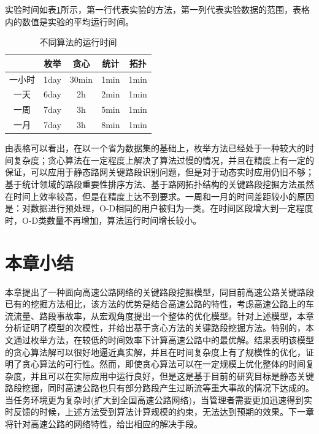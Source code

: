 				实验时间如表\ref{table1}所示，第一行代表实验的方法，第一列代表实验数据的范围，表格内的数值是实验的平均运行时间。

				\begin{table}[h]
				\centering
				\begin{tabular}{|c|c|c|c|c|}
				\hline
				\hline
				   &   枚举 &   贪心 &   统计 &   拓扑 \\
				\hline
				  一小时 &   1day &   30min &   1min &   1min \\
				\hline
				  一天 &   6day &   2h &   2min &   1min \\
				\hline
				  一周 &   7day &   3h &   5min &   1min \\
				\hline
				  一月 &   7day &   3h &   8min &   1min \\
				\hline
				\end{tabular}
				\caption{不同算法的运行时间}
				\label{table1}
				\end{table} 

				由表格可以看出，在以一个省为数据集的基础上，枚举方法已经处于一种较大的时间复杂度；贪心算法在一定程度上解决了算法过慢的情况，并且在精度上有一定的保证，可以应用于静态路网关键路段识别问题，但是对于动态实时应用仍旧不够；基于统计领域的路段重要性排序方法、基于路网拓扑结构的关键路段挖掘方法虽然在时间上效率较高，但是在精度上达不到要求。一周和一月的时间差距较小的原因是：对数据进行预处理，O-D相同的用户被归为一类。在时间区段增大到一定程度时，O-D类数量不再增加，算法运行时间增长较小。

		\section{本章小结}
			本章提出了一种面向高速公路网络的关键路段挖掘模型，同目前高速公路关键路段已有的挖掘方法相比，该方法的优势是结合高速公路的特性，考虑高速公路上的车流流量、路段事故率，从宏观角度提出一个整体的优化模型。针对上述模型，本章分析证明了模型的次模性，并给出基于贪心方法的关键路段挖掘方法。特别的，本文通过枚举方法，在较低的时间效率下计算高速公路中的最优解。结果表明该模型的贪心算法解可以很好地逼近真实解，并且在时间复杂度上有了规模性的优化，证明了贪心算法的可行性。然而，即使贪心算法可以在一定规模上优化整体的时间复杂度，并且可以在实际应用中运行良好，但是这是基于目前的研究目标是静态关键路段挖掘，同时高速公路也只有部分路段产生过断流等重大事故的情况下达成的。当任务环境更为复杂时(扩大到全国高速公路网络)，当管理者需要更加迅速得到实时反馈的时候，上述方法受到算法计算规模的约束，无法达到预期的效果。下一章将针对高速公路的网络特性，给出相应的解决手段。





			
